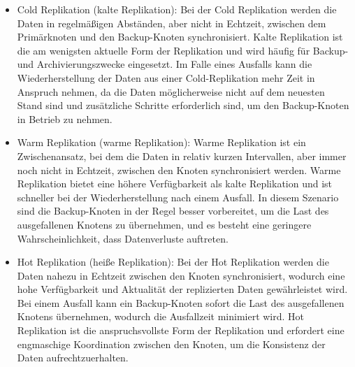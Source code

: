\begin{itemize}
\item Cold Replikation (kalte Replikation): Bei der Cold Replikation werden die Daten in regelmäßigen Abständen, aber nicht in Echtzeit, zwischen dem Primärknoten und den Backup-Knoten synchronisiert. Kalte Replikation ist die am wenigsten aktuelle Form der Replikation und wird häufig für Backup- und Archivierungszwecke eingesetzt. Im Falle eines Ausfalls kann die Wiederherstellung der Daten aus einer Cold-Replikation mehr Zeit in Anspruch nehmen, da die Daten möglicherweise nicht auf dem neuesten Stand sind und zusätzliche Schritte erforderlich sind, um den Backup-Knoten in Betrieb zu nehmen.
\item Warm Replikation (warme Replikation): Warme Replikation ist ein Zwischenansatz, bei dem die Daten in relativ kurzen Intervallen, aber immer noch nicht in Echtzeit, zwischen den Knoten synchronisiert werden. Warme Replikation bietet eine höhere Verfügbarkeit als kalte Replikation und ist schneller bei der Wiederherstellung nach einem Ausfall. In diesem Szenario sind die Backup-Knoten in der Regel besser vorbereitet, um die Last des ausgefallenen Knotens zu übernehmen, und es besteht eine geringere Wahrscheinlichkeit, dass Datenverluste auftreten.
\item Hot Replikation (heiße Replikation): Bei der Hot Replikation werden die Daten nahezu in Echtzeit zwischen den Knoten synchronisiert, wodurch eine hohe Verfügbarkeit und Aktualität der replizierten Daten gewährleistet wird. Bei einem Ausfall kann ein Backup-Knoten sofort die Last des ausgefallenen Knotens übernehmen, wodurch die Ausfallzeit minimiert wird. Hot Replikation ist die anspruchsvollste Form der Replikation und erfordert eine engmaschige Koordination zwischen den Knoten, um die Konsistenz der Daten aufrechtzuerhalten.
\end{itemize}

